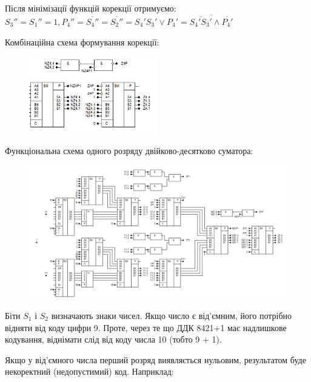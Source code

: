 \documentclass[12pt,a4paper]{article}
\begin{document}
    Після мінімізації функцій корекції отримуємо:
    $S_3'' = S_1'' = 1, P_4'' = \overline{S_4''} = \overline{S_2''} = S_4' S_3' \vee P_4' = \overline{\overline{S_4' S_3'} \land \overline{P_4'}}$

    \vspace{1em}

    \setlength{\parindent}{0pt}

    Комбінаційна схема формування корекції:

    \begin{figure}[ht]
        \centering
        \includegraphics[width=0.5\textwidth]{1.png}
    \end{figure}

    \newpage

    Функціональна схема одного розряду двійково-десятково суматора:

    \begin{figure}[ht]
        \centering
        \includegraphics[width=1.00\textwidth]{2.png}
    \end{figure}

    Біти $S_1$ і $S_2$ визначають знаки чисел. Якщо число є від’ємним, його потрібно відняти від коду цифри 9. Проте, через те що ДДК 8421+1
    має надлишкове кодування, віднімати слід від коду числа 10 (тобто 9 + 1).

    \vspace{1em}

    Якщо у від'ємного числа перший розряд виявляється нульовим, результатом буде некоректний (недопустимий) код.
    Наприклад:
\end{document}
